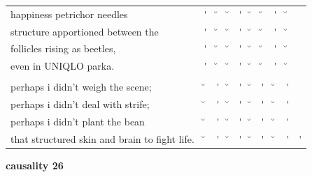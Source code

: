 \documentclass[12pt, landscape]{article}
\begin{document}
\begin{center}
\begin{tabularx}{\textwidth}{
>{\lefting\arraybackslash}X
c
c
c
c
c
c
c
c
c
}

happiness petrichor needles & \'{} & \u{} & \u{} & \'{} & \u{} & \u{} & \'{} & \u{} & \\
structure apportioned between the & \'{} & \u{} & \u{} & \'{} & \u{} & \u{} & \'{} & \u{} & \\
follicles rising as beetles, & \'{} & \u{} & \u{} & \'{} & \u{} & \u{} & \'{} & \u{} & \\
even in UNIQLO parka. & \'{} & \u{} & \u{} & \'{} & \u{} & \u{} & \'{} & \u{} & \\
 & & & & & & & & \\
perhaps i didn't weigh the scene; & \u{} & \'{} & \u{} & \'{} & \u{} & \'{} & \u{} & \'{} & \\
perhaps i didn't deal with strife; & \u{} & \'{} & \u{} & \'{} & \u{} & \'{} & \u{} & \'{} & \\
perhaps i didn't plant the bean & \u{} & \'{} & \u{} & \'{} & \u{} & \'{} & \u{} & \'{} & \\
that structured skin and brain to fight life. & \u{} & \'{} & \u{} & \'{} & \u{} & \'{} & \u{} & \'{} & \'{} \\

\end{tabularx}
\end{center}

\vspace*{\fill}

\newpage

\vspace*{\fill}

\noindent \textbf{causality 26}
\noindent \hfill \par
\end{document}
